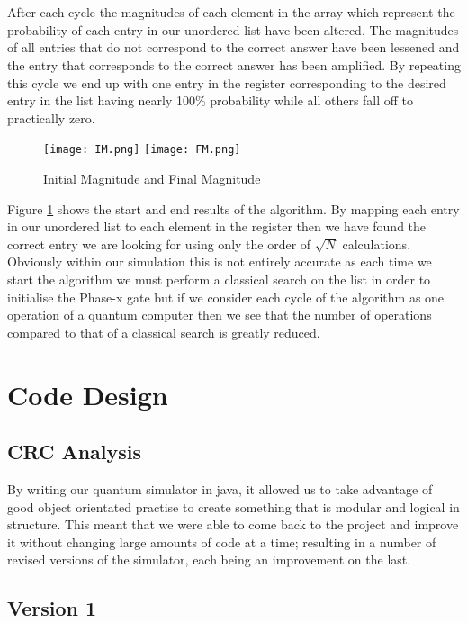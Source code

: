 \documentclass[12pt]{report}
\begin{document}
\\ \\
After each cycle the magnitudes of each element in the array which represent the probability of each entry in our unordered list have been altered. The magnitudes of all entries that do not correspond to the correct answer have been lessened and the entry that corresponds to the correct answer has been amplified. By repeating this cycle we end up with one entry in the register corresponding to the desired entry in the list having nearly 100\% probability while all others fall off to practically zero. 
\begin{figure}[h!]
\texttt{[image: IM.png]}
\texttt{[image: FM.png]}
\caption{Initial Magnitude and Final Magnitude}
\label{fig:IM}
\end{figure}
Figure \ref{fig:IM} shows the start and end results of the algorithm. By mapping each entry in our unordered list to each element in the register then we have found the correct entry we are looking for using only the order of $\sqrt{N}$ calculations. Obviously within our simulation this is not entirely accurate as each time we start the algorithm we must perform a classical search on the list in order to initialise the Phase-x gate but if we consider each cycle of the algorithm as one operation of a quantum computer then we see that the number of operations compared to that of a classical search is greatly reduced.
\chapter{Code Design}
\section{CRC Analysis}
\label{sec:CRC}
By writing our quantum simulator in java, it allowed us to take advantage of good object orientated practise to create something that is modular and logical in structure.  This meant that we were able to come back to the project and improve it without changing large amounts of code at a time; resulting in a number of revised versions of the simulator, each being an improvement on the last.

\section{Version 1}
\end{document}
